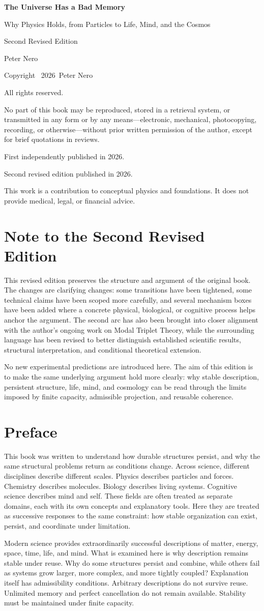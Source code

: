 \documentclass[11pt,twoside,openright]{book}
\newcommand{\BlockParagraphStyle}{%
  \setlength{\parindent}{0pt}%
  \setlength{\parskip}{5pt plus 1pt minus 1pt}%
}
\newcommand{\BookTitle}{The Universe Has a Bad Memory}
\newcommand{\BookSubtitle}{Why Physics Holds, from Particles to Life, Mind, and the Cosmos}
\newcommand{\BookEdition}{Second Revised Edition}
\newcommand{\BookAuthor}{Peter Nero}
\newcommand{\BookCopyrightYear}{2026}
\newcommand{\TitlePage}{
  \thispagestyle{empty}
  \vspace*{1.2in}
  {\centering
    {\Huge\bfseries \BookTitle \par}
    \vspace{0.35in}
    {\Large \BookSubtitle \par}
    \vspace{0.3in}
    {\normalsize \BookEdition \par}
    \vspace{0.9in}
    {\Large \BookAuthor \par}
  }
  \vfill
  \clearpage
}
\newcommand{\CopyrightPage}{
  \thispagestyle{empty}
  \vspace*{1.0in}
  {\small
  Copyright \textcopyright\ \BookCopyrightYear\ \BookAuthor\par
  All rights reserved.\par
  \vspace{0.25in}
  No part of this book may be reproduced, stored in a retrieval system, or transmitted in any form
  or by any means---electronic, mechanical, photocopying, recording, or otherwise---without prior
  written permission of the author, except for brief quotations in reviews.\par
  \vspace{0.25in}
  First independently published in \BookCopyrightYear.\par
  Second revised edition published in \BookCopyrightYear.\par
  \vspace{0.25in}
  This work is a contribution to conceptual physics and foundations. It does not provide medical, legal, or
  financial advice.\par
  }
  \vfill
  \clearpage
}
\begin{document}
\frontmatter
\BlockParagraphStyle
\TitlePage
\CopyrightPage


\chapter*{Note to the Second Revised Edition}

This revised edition preserves the structure and argument of the original book. The changes are clarifying changes: some transitions have been tightened, some technical claims have been scoped more carefully, and several mechanism boxes have been added where a concrete physical, biological, or cognitive process helps anchor the argument. The second arc has also been brought into closer alignment with the author's ongoing work on Modal Triplet Theory, while the surrounding language has been revised to better distinguish established scientific results, structural interpretation, and conditional theoretical extension.

No new experimental predictions are introduced here. The aim of this edition is to make the same underlying argument hold more clearly: why stable description, persistent structure, life, mind, and cosmology can be read through the limits imposed by finite capacity, admissible projection, and reusable coherence.

\cleardoublepage
\thispagestyle{empty}

\chapter*{Preface}

This book was written to understand how durable structures persist, and why the same structural problems return as conditions change. Across science, different disciplines describe different scales. Physics describes particles and forces. Chemistry describes molecules. Biology describes living systems. Cognitive science describes mind and self. These fields are often treated as separate domains, each with its own concepts and explanatory tools. Here they are treated as successive responses to the same constraint: how stable organization can exist, persist, and coordinate under limitation.

Modern science provides extraordinarily successful descriptions of matter, energy, space, time, life, and mind. What is examined here is why description remains stable under reuse. Why do some structures persist and combine, while others fail as systems grow larger, more complex, and more tightly coupled? Explanation itself has admissibility conditions. Arbitrary descriptions do not survive reuse. Unlimited memory and perfect cancellation do not remain available. Stability must be maintained under finite capacity.
\end{document}
